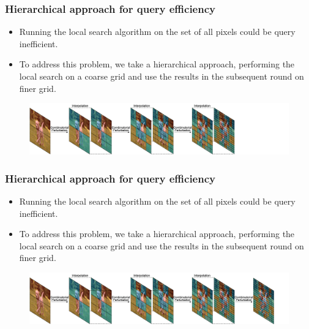 \documentclass[10pt,mathserif]{beamer}
\begin{document}
\begin{frame}
    \frametitle{Hierarchical approach for query efficiency}
    \begin{itemize}\itemsep=12pt
        \item Running the local search algorithm on the set of all pixels could be query inefficient.
        \item To address this problem, we take a hierarchical approach, performing the local search on a coarse grid and use the results in the subsequent round on finer grid.
    \end{itemize}
    \begin{figure}
        \centering
        \hspace*{-2.5em}
        \includegraphics[scale=0.35]{figures/hierarchical_4.png}
    \end{figure}
\end{frame}

\begin{frame}
    \frametitle{Hierarchical approach for query efficiency}
    \begin{itemize}\itemsep=12pt
        \item Running the local search algorithm on the set of all pixels could be query inefficient.
        \item To address this problem, we take a hierarchical approach, performing the local search on a coarse grid and use the results in the subsequent round on finer grid.
    \end{itemize}
    \begin{figure}
        \centering
        \hspace*{-2.5em}
        \includegraphics[scale=0.35]{figures/hierarchical_5.png}
    \end{figure}
\end{frame}

\end{document}
